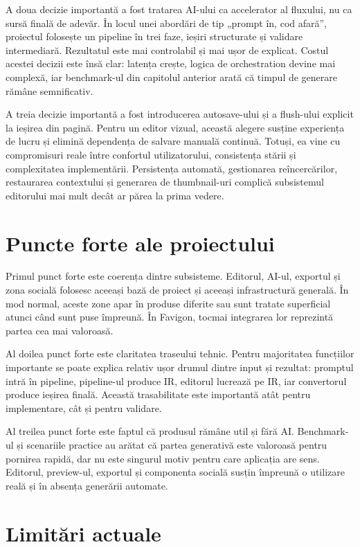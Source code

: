 A doua decizie importantă a fost tratarea AI-ului ca accelerator al fluxului, nu ca sursă finală de adevăr. În locul unei abordări de tip „prompt în, cod afară”, proiectul folosește un pipeline în trei faze, ieșiri structurate și validare intermediară. Rezultatul este mai controlabil și mai ușor de explicat. Costul acestei decizii este însă clar: latența crește, logica de orchestration devine mai complexă, iar benchmark-ul din capitolul anterior arată că timpul de generare rămâne semnificativ.

A treia decizie importantă a fost introducerea autosave-ului și a flush-ului explicit la ieșirea din pagină. Pentru un editor vizual, această alegere susține experiența de lucru și elimină dependența de salvare manuală continuă. Totuși, ea vine cu compromisuri reale între confortul utilizatorului, consistența stării și complexitatea implementării. Persistența automată, gestionarea reîncercărilor, restaurarea contextului și generarea de thumbnail-uri complică subsistemul editorului mai mult decât ar părea la prima vedere.

\section{Puncte forte ale proiectului}

Primul punct forte este coerența dintre subsisteme. Editorul, AI-ul, exportul și zona socială folosesc aceeași bază de proiect și aceeași infrastructură generală. În mod normal, aceste zone apar în produse diferite sau sunt tratate superficial atunci când sunt puse împreună. În Favigon, tocmai integrarea lor reprezintă partea cea mai valoroasă.

Al doilea punct forte este claritatea traseului tehnic. Pentru majoritatea funcțiilor importante se poate explica relativ ușor drumul dintre input și rezultat: promptul intră în pipeline, pipeline-ul produce IR, editorul lucrează pe IR, iar convertorul produce ieșirea finală. Această trasabilitate este importantă atât pentru implementare, cât și pentru validare.

Al treilea punct forte este faptul că produsul rămâne util și fără AI. Benchmark-ul și scenariile practice au arătat că partea generativă este valoroasă pentru pornirea rapidă, dar nu este singurul motiv pentru care aplicația are sens. Editorul, preview-ul, exportul și componenta socială susțin împreună o utilizare reală și în absența generării automate.

\section{Limitări actuale}

